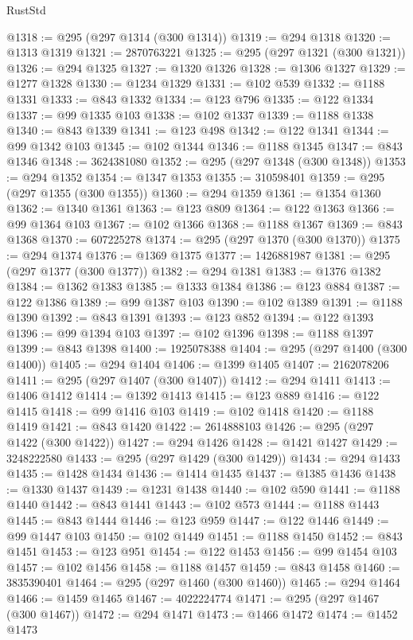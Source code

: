 \begin{lexlean}{RustStd}
\begin{coremodule}
@1318 := @295 (@297 @1314 (@300 @1314))
@1319 := @294 @1318
@1320 := @1313 @1319
@1321 := 2870763221
@1325 := @295 (@297 @1321 (@300 @1321))
@1326 := @294 @1325
@1327 := @1320 @1326
@1328 := @1306 @1327
@1329 := @1277 @1328
@1330 := @1234 @1329
@1331 := @102 @539
@1332 := @1188 @1331
@1333 := @843 @1332
@1334 := @123 @796
@1335 := @122 @1334
@1337 := @99 @1335 @103
@1338 := @102 @1337
@1339 := @1188 @1338
@1340 := @843 @1339
@1341 := @123 @498
@1342 := @122 @1341
@1344 := @99 @1342 @103
@1345 := @102 @1344
@1346 := @1188 @1345
@1347 := @843 @1346
@1348 := 3624381080
@1352 := @295 (@297 @1348 (@300 @1348))
@1353 := @294 @1352
@1354 := @1347 @1353
@1355 := 310598401
@1359 := @295 (@297 @1355 (@300 @1355))
@1360 := @294 @1359
@1361 := @1354 @1360
@1362 := @1340 @1361
@1363 := @123 @809
@1364 := @122 @1363
@1366 := @99 @1364 @103
@1367 := @102 @1366
@1368 := @1188 @1367
@1369 := @843 @1368
@1370 := 607225278
@1374 := @295 (@297 @1370 (@300 @1370))
@1375 := @294 @1374
@1376 := @1369 @1375
@1377 := 1426881987
@1381 := @295 (@297 @1377 (@300 @1377))
@1382 := @294 @1381
@1383 := @1376 @1382
@1384 := @1362 @1383
@1385 := @1333 @1384
@1386 := @123 @884
@1387 := @122 @1386
@1389 := @99 @1387 @103
@1390 := @102 @1389
@1391 := @1188 @1390
@1392 := @843 @1391
@1393 := @123 @852
@1394 := @122 @1393
@1396 := @99 @1394 @103
@1397 := @102 @1396
@1398 := @1188 @1397
@1399 := @843 @1398
@1400 := 1925078388
@1404 := @295 (@297 @1400 (@300 @1400))
@1405 := @294 @1404
@1406 := @1399 @1405
@1407 := 2162078206
@1411 := @295 (@297 @1407 (@300 @1407))
@1412 := @294 @1411
@1413 := @1406 @1412
@1414 := @1392 @1413
@1415 := @123 @889
@1416 := @122 @1415
@1418 := @99 @1416 @103
@1419 := @102 @1418
@1420 := @1188 @1419
@1421 := @843 @1420
@1422 := 2614888103
@1426 := @295 (@297 @1422 (@300 @1422))
@1427 := @294 @1426
@1428 := @1421 @1427
@1429 := 3248222580
@1433 := @295 (@297 @1429 (@300 @1429))
@1434 := @294 @1433
@1435 := @1428 @1434
@1436 := @1414 @1435
@1437 := @1385 @1436
@1438 := @1330 @1437
@1439 := @1231 @1438
@1440 := @102 @590
@1441 := @1188 @1440
@1442 := @843 @1441
@1443 := @102 @573
@1444 := @1188 @1443
@1445 := @843 @1444
@1446 := @123 @959
@1447 := @122 @1446
@1449 := @99 @1447 @103
@1450 := @102 @1449
@1451 := @1188 @1450
@1452 := @843 @1451
@1453 := @123 @951
@1454 := @122 @1453
@1456 := @99 @1454 @103
@1457 := @102 @1456
@1458 := @1188 @1457
@1459 := @843 @1458
@1460 := 3835390401
@1464 := @295 (@297 @1460 (@300 @1460))
@1465 := @294 @1464
@1466 := @1459 @1465
@1467 := 4022224774
@1471 := @295 (@297 @1467 (@300 @1467))
@1472 := @294 @1471
@1473 := @1466 @1472
@1474 := @1452 @1473

\end{coremodule}
\end{lexlean}
